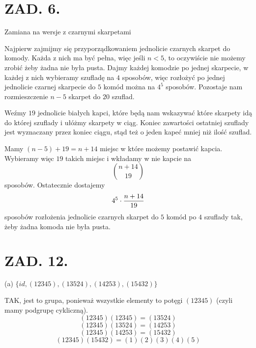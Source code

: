 \documentclass{article}[13pt]
\begin{document}
\section*{ZAD. 6.}

{\color{def}Zamiana na wersje z czarnymi skarpetami}
\medskip

Najpierw zajmijmy się przyporządkowaniem jednolicie czarnych skarpet do komody. Każda z nich ma być pełna, więc jeśli $n<5$, to oczywiście nie możemy zrobić żeby żadna nie była pusta. Dajmy każdej komodzie po jednej skarpecie, w każdej z nich wybieramy szufladę na $4$ sposobów, więc rozłożyć po jednej jednolicie czarnej skarpecie do $5$ komód można na $4^5$ sposobów. Pozostaje nam rozmieszczenie $n-5$ skarpet do $20$ szuflad.
\medskip

Weźmy $19$ jednolicie białych kapci, które będą nam wskazywać które skarpety idą do której szuflady i ułóżmy skarpety w ciąg. Koniec zawartości ostatniej szuflady jest wyznaczany przez koniec ciągu, stąd też o jeden kapeć mniej niż ilość szuflad.

Mamy $(n-5)+19=n+14$ miejsc w które możemy postawić kapcia. Wybieramy więc $19$ takich miejsc i wkładamy w nie kapcie na
$${n+14\choose 19}$$
sposobów. Ostatecznie dostajemy
$$4^5\cdot{n+14\over 19}$$
sposobów rozłożenia jednolicie czarnych skarpet do $5$ komód po $4$ szuflady tak, żeby żadna komoda nie była pusta.




\section*{ZAD. 12.}

{\color{acc}(a)} $\{id, (12345), (13524), (14253), (15432)\}$
\smallskip

TAK, jest to grupa, ponieważ wszystkie elementy to potęgi $(12345)$ (czyli mamy podgrupę cykliczną).
$$(12345)(12345)=(13524)$$
$$(12345)(13524)=(14253)$$
$$(12345)(14253)=(15432)$$
$$(12345)(15432)=(1)(2)(3)(4)(5)$$
\end{document}
